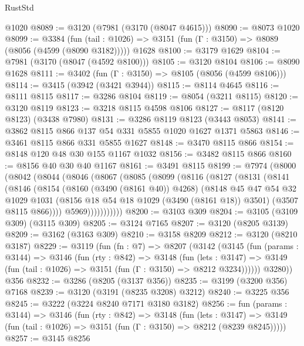 \begin{lexlean}{RustStd}
\begin{coremodule}
    @1020
@8089 := @3120 (@7981 (@3170 (@8047 @4615)))
@8090 := @8073 @1020
@8099 := @3384
    (fun (tail : @1026) => @3151 (fun (Γ : @3150) => @8089 (@8056 (@4599 (@8090 @3182)))))
    @1628
@8100 := @3179 @1629
@8104 := @7981 (@3170 (@8047 (@4592 @8100)))
@8105 := @3120 @8104
@8106 := @8090 @1628
@8111 := @3402 (fun (Γ : @3150) => @8105 (@8056 (@4599 @8106)))
@8114 := @3415 (@3942 (@3421 @3944))
@8115 := @8114 @4645
@8116 := @8111 @8115
@8117 := @3286 @8104
@8119 := @8054 (@3211 @8115)
@8120 := @3120 @8119
@8123 := @3218 @8115 @4598 @8106
@8127 := @8117 (@8120 @8123) (@3438 @7980)
@8131 := @3286 @8119 @8123 (@3443 @8053)
@8141 := @3862 @8115 @866 @137 @54 @331 @5855 @1020 @1627 @1371 @5863
@8146 := @3461 @8115 @866 @331 @5855 @1627
@8148 := @3470 @8115 @866
@8154 := @8148 @120 @48 @30 @155 @1167 @1032
@8156 := @3482 @8115 @866
@8160 := @8156 @40 @30 @40 @1167
@8161 := @3491 @8115
@8199 := @7974
    (@8000
      (@8042
        (@8044
          (@8046
            (@8067
              (@8085
                (@8099
                  (@8116
                    (@8127
                      (@8131
                        (@8141
                          (@8146
                            (@8154
                              (@8160 (@3490 (@8161 @40)) @4268)
                              (@8148
                                @45
                                @47
                                @54
                                @32
                                @1029
                                @1031
                                (@8156 @18 @54 @18 @1029 (@3490 (@8161 @18)) @3501)
                                (@3507 @8115 @866))))
                          @5969)))))))))))
@8200 := @3103 @309
@8204 := @3105 (@3109 @309) (@3115 @309)
@8205 := @3124 @7165
@8207 := @3120 (@8205 @3139)
@8209 := @3162 (@3163 @309)
@8210 := @3158 @8209
@8212 := @3120 (@8210 @3187)
@8229 := @3119
    (fun (fn : @7) =>
    @8207
      (@3142
        (@3145
          (fun (params : @3144) =>
          @3146
            (fun (rty : @842) =>
            @3148
              (fun (lets : @3147) =>
              @3149 (fun (tail : @1026) => @3151 (fun (Γ : @3150) => @8212 @3234))))))
        @3280))
    @356
@8232 := @3286 (@8205 (@3137 @356))
@8235 := @3199 (@3200 @356) @7168
@8239 := @3120 (@3191 (@8235 @3208) @3212)
@8240 := @3225 @356
@8245 := @3222 (@3224 @8240 @7171 @3180 @3182)
@8256 := fun (params : @3144) =>
  @3146
    (fun (rty : @842) =>
    @3148
      (fun (lets : @3147) =>
      @3149 (fun (tail : @1026) => @3151 (fun (Γ : @3150) => @8212 (@8239 @8245)))))
@8257 := @3145 @8256

\end{coremodule}
\end{lexlean}
